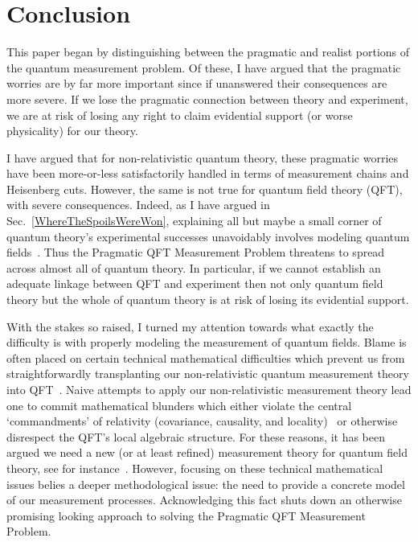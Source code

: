 \documentclass[prd,twocolumn,superscriptaddress,floatfix,amsmath,amssymb,amsfonts,nofootinbib]{revtex4-2}
\begin{document}
\section{Conclusion}\label{Conclusion}
This paper began by distinguishing between the pragmatic and realist portions of the quantum measurement problem. Of these, I have argued that the pragmatic worries are by far more important since if unanswered their consequences are more severe. If we lose the pragmatic connection between theory and experiment, we are at risk of losing any right to claim evidential support (or worse physicality) for our theory.

I have argued that for non-relativistic quantum theory, these pragmatic worries have been more-or-less satisfactorily handled in terms of measurement chains and Heisenberg cuts. However, the same is not true for quantum field theory (QFT), with severe consequences. Indeed, as I have argued in Sec.~\ref{WhereTheSpoilsWereWon}, explaining all but maybe a small corner of quantum theory's experimental successes unavoidably involves modeling quantum fields~\cite{WallaceBlueSkyTalk,WallaceBlueSkyPaper}. Thus the Pragmatic QFT Measurement Problem threatens to spread across almost all of quantum theory. In particular, if we cannot establish an adequate linkage between QFT and experiment then not only quantum field theory but the whole of quantum theory is at risk of losing its evidential support.

With the stakes so raised, I turned my attention towards what exactly the difficulty is with properly modeling the measurement of quantum fields. Blame is often placed on certain technical mathematical difficulties which prevent us from straightforwardly transplanting our non-relativistic quantum measurement theory into QFT~\cite{pologomez2021detectorbased,Jubb2022,BorstenJubbKells,fewster1,fewster2,fewster3,Anastopoulos2022,Sorkin,TaleOfTwo,Ruep2021,JoseMariaEdu,Sorkin,Redhead1995,Dowker,Dowker2,borsten,alvaro,Adam}. Naive attempts to apply our non-relativistic measurement theory lead one to commit mathematical blunders which either violate the central `commandments' of relativity (covariance, causality, and locality)~\cite{Sorkin,Redhead1995,Dowker,Dowker2,borsten,alvaro,Adam} or otherwise disrespect the QFT's local algebraic structure. For these reasons, it has been argued we need a new (or at least refined) measurement theory for quantum field theory, see for instance~\cite{pologomez2021detectorbased,Jubb2022,fewster2}. However, focusing on these technical mathematical issues belies a deeper methodological issue: the need to provide a concrete model of our measurement processes. Acknowledging this fact shuts down an otherwise promising looking approach to solving the Pragmatic QFT Measurement Problem.
\end{document}
